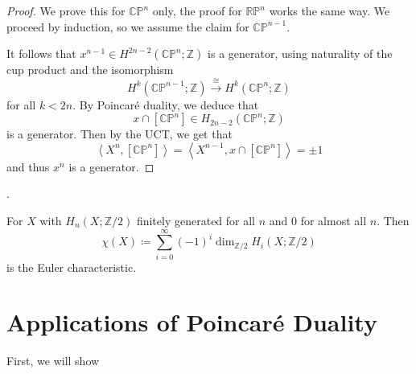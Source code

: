 \begin{proof}
  We prove this for $\mathbb{C}\mathbb{P}^n$ only,
  the proof for $\mathbb{R}\mathbb{P}^n$ works the same way.
  We proceed by induction, so we assume the claim for $\mathbb{C}\mathbb{P}^{n-1}$.

  It follows that $x^{n-1} \in H^{2n-2}(\mathbb{C}\mathbb{P}^n ;\mathbb{Z})$ 
  is a generator, using naturality of the cup product and the
  isomorphism
  \[
    H^k(\mathbb{C}\mathbb{P}^{n-1};\mathbb{Z})
    \xrightarrow{\cong}
    H^k(\mathbb{C}\mathbb{P}^n;\mathbb{Z})
  \] 
  for all $k<2n$. 
  By Poincaré duality, we deduce that
  \[
    x \cap [\mathbb{C}\mathbb{P}^n] \in H_{2n-2}(\mathbb{C}\mathbb{P}^n;\mathbb{Z})
  \]
  is a generator.
  Then by the UCT, we get that
  \[
    \left< X^n, [\mathbb{C}\mathbb{P}^n] \right>
    =
    \left< X^{n-1}, x \cap [\mathbb{C}\mathbb{P}^n] \right>
    =
    \pm 1
  \]
  and thus $x^n$ is a generator.
\end{proof}

.

\begin{definition}
  For $X$ with $H_n(X;\mathbb{Z}/2)$ finitely generated for all $n$
  and  $0$ for almost all $n$.
  Then
   \[
    \chi(X) \coloneqq \sum_{i=0}^{\infty} (-1)^i \dim_{\mathbb{Z}/2} H_i(X;\mathbb{Z}/2)
  \]
  is the Euler characteristic.
\end{definition}




\section{Applications of Poincaré Duality}

First, we will show
